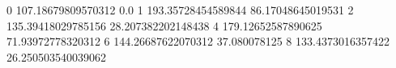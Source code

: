 0 107.18679809570312 0.0
1 193.35728454589844 86.17048645019531
2 135.39418029785156 28.207382202148438
4 179.12652587890625 71.93972778320312
6 144.26687622070312 37.080078125
8 133.4373016357422 26.250503540039062
